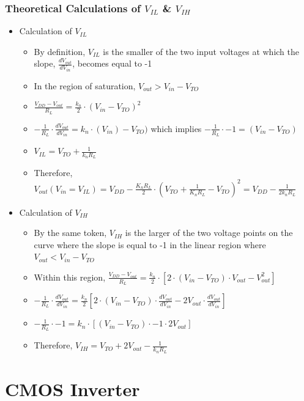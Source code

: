 \documentclass[12pt]{article}
\begin{document}
\subsubsection{Theoretical Calculations of $V_{IL}$ \& $V_{IH}$}
\begin{itemize}
\item Calculation of $V_{IL}$
\begin{itemize}
\item By definition, $V_{IL}$ is the smaller of the two input voltages at which the slope, $\frac{dV_{out}}{dV_{in}}$, becomes equal to -1
\item In the region of saturation, $V_{out} > V_{in} - V_{TO}$
\item $\frac{V_{DD} - V_{out}}{R_L}=\frac{k_n}{2} \cdot (V_{in} - V_{TO})^{2}$
\item $-\frac{1}{R_L} \cdot \frac{dV_{out}}{dV_{in}}=k_n \cdot (V_{in}) - V_{TO})$ which implies $-\frac{1}{R_L} \cdot -1 = (V_{in}-V_{TO})$
\item $V_{IL}=V_{TO}+\frac{1}{k_nR_L}$
\item Therefore, $V_{out}(V_{in}=V_{IL})=V_{DD}-\frac{K_nR_L}{2} \cdot \left( V_{TO}+\frac{1}{K_nR_L} - V_{TO} \right)^{2} = V_{DD} - \frac{1}{2k_nR_L}$
\end{itemize}
\item Calculation of $V_{IH}$
\begin{itemize}
\item By the same token, $V_{IH}$ is the larger of the two voltage points on the curve where the slope is equal to -1 in the linear region where $V_{out} < V_{in} - V_{TO}$
\item Within this region, $\frac{V_{DD} - V_{out}}{R_L} = \frac{k_n}{2} \cdot \left[ 2 \cdot (V_{in} - V_{TO}) \cdot V_{out} - V_{out}^{2} \right]$
\item $-\frac{1}{R_L} \cdot \frac{dV_{out}}{dV_{in}} = \frac{k_n}{2} \left[ 2 \cdot (V_{in} - V_{TO}) \cdot \frac{dV_{out}}{dV_{in}} - 2V_{out} \cdot \frac{dV_{out}}{dV_{in}} \right]$
\item $-\frac{1}{R_L} \cdot -1 = k_n \cdot \left[ (V_{in} - V_{TO}) \cdot -1 \cdot 2V_{out} \right]$
\item Therefore, $V_{IH}=V_{TO}+2V_{out}-\frac{1}{k_nR_L}$
\end{itemize}
\end{itemize}

\section{CMOS Inverter}
\end{document}
